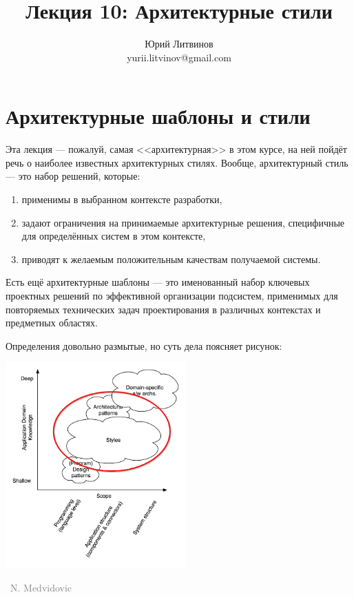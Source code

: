 \documentclass[a5paper]{article}
\title{Лекция 10: Архитектурные стили}
\author{Юрий Литвинов\\\small{yurii.litvinov@gmail.com}}
\date{}
\newcommand{\attribution}[1] {
    \vspace{-4mm}\begin{flushright}\begin{scriptsize}\textcolor{gray}
    {\textcopyright\, #1}\end{scriptsize}\end{flushright}
}
\begin{document}
\maketitle
\thispagestyle{empty}

\section{Архитектурные шаблоны и стили}

Эта лекция --- пожалуй, самая <<архитектурная>> в этом курсе, на ней пойдёт речь о наиболее известных архитектурных стилях. Вообще, архитектурный стиль --- это набор решений, которые:

\begin{enumerate}
    \item применимы в выбранном контексте разработки,
    \item задают ограничения на принимаемые архитектурные решения, специфичные для определённых систем в этом контексте,
    \item приводят к желаемым положительным качествам получаемой системы.
\end{enumerate}

Есть ещё архитектурные шаблоны --- это именованный набор ключевых проектных решений по эффективной организации подсистем, применимых для повторяемых технических задач проектирования в различных контекстах и предметных областях.

Определения довольно размытые, но суть дела поясняет рисунок:

\begin{center}
    \includegraphics[width=0.52\textwidth]{architecturalStylesHighlighted.png}
    \attribution{N. Medvidovic}
\end{center}
\end{document}
